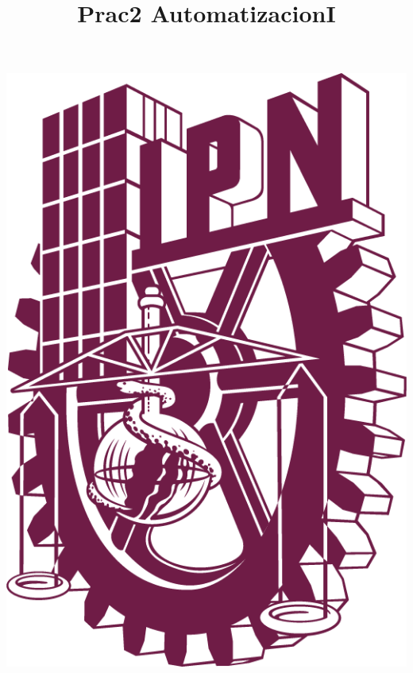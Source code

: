 	
\title{Prac2 AutomatizacionI}

\thispagestyle{empty} %

\begin{center}
\newcommand{\HRule}{\rule{\linewidth}{1mm}}

\begin{minipage}{0.48\textwidth}
	\begin{flushleft}
		\includegraphics[scale = 0.125]{images/LOGO POLI PANTONE 222 C.png}
	\end{flushleft}
\end{minipage}

\end{center}
